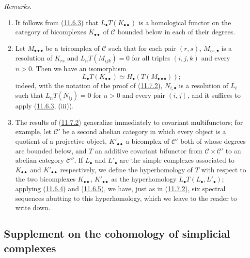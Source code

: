 \begin{env}[11.7.3]
\label{0.11.7.3}
\emph{Remarks}.
\begin{enumerate}
\item[{\rm(i)}] It follows from (\hyperref[0.11.6.3]{11.6.3}) that
$L_\bullet T(K_{\bullet\bullet})$ is a homological functor on the
category of bicomplexes $K_{\bullet\bullet}$ of $\mathcal C$ bounded below
in each of their degrees.
\item[{\rm(ii)}] Let $M_{\bullet\bullet\bullet}$ be a tricomplex of
$\mathcal C$ such that for each pair $(r,s)$,
$M_{rs,\bullet}$ is a resolution of $K_{rs}$ and
$L_nT(M_{ijk})=0$ for all triples $(i,j,k)$ and every $n>0$. Then we have
an isomorphism
\[
L_\bullet T(K_{\bullet\bullet})
\simeq H_\bullet(T(M_{\bullet\bullet\bullet}));
\]
indeed, with the notation of the proof of
(\hyperref[0.11.7.2]{11.7.2}), $N_{i,\bullet}$ is a resolution of
$L_i$ such that $L_nT(N_{ij})=0$ for $n>0$ and every pair $(i,j)$, and it
suffices to apply (\hyperref[0.11.6.3]{11.6.3}, (iii)).
\item[{\rm(iii)}] The results of (\hyperref[0.11.7.2]{11.7.2}) generalize
immediately to covariant multifunctors; for example,
let $\mathcal C'$ be a second abelian category in which every object
is a quotient of a projective object, $K'_{\bullet\bullet}$ a bicomplex of
$\mathcal C'$ both of whose degrees are bounded below, and $T$ an
additive covariant bifunctor from $\mathcal C\times\mathcal C'$ to an
abelian category $\mathcal C''$. If $L_\bullet$ and $L'_\bullet$ are the
simple complexes associated to $K_{\bullet\bullet}$ and
$K'_{\bullet\bullet}$ respectively, we define the hyperhomology of $T$ with
respect to the two bicomplexes $K_{\bullet\bullet}$,
$K'_{\bullet\bullet}$ as the hyperhomology
$L_\bullet T(L_\bullet,L'_\bullet)$; applying
(\hyperref[0.11.6.4]{11.6.4}) and
(\hyperref[0.11.6.5]{11.6.5}), we have, just as in
(\hyperref[0.11.7.2]{11.7.2}), six spectral sequences abutting to this
hyperhomology, which we leave to the reader to write down.
\end{enumerate}
\end{env}

\subsection{Supplement on the cohomology of simplicial complexes}
\label{subsection:0.11.8}

